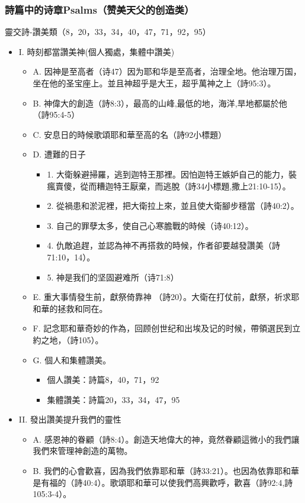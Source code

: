 \subsubsection{詩篇中的诗章Psalms（赞美天父的创造类）}
靈交詩-讚美類（8，20，33，34，40，47，71，92，95）
\begin{itemize}
\item I.	時刻都當讚美神(個人獨處，集體中讚美) 
\begin{itemize}
\item A.	因神是至高者（诗47）因为耶和华是至高者，治理全地。他治理万国，坐在他的圣宝座上。並且神超乎是大王，超乎萬神之上（詩95:3）。
\item B.	神偉大的創造（詩8:3），最高的山峰,最低的地，海洋,旱地都屬於他（詩95:4-5）
\item C.	安息日的時候歌頌耶和華至高的名（詩92小標題）
\item D.	遭難的日子
\begin{itemize}
\item 1.	大衛躲避掃羅，逃到迦特王那裡。因怕迦特王嫉妒自己的能力，裝瘋賣傻，從而糟迦特王厭棄，而逃脫（詩34小標題,撒上21:10-15）。
\item 2.	從禍患和淤泥裡，把大衛拉上來，並且使大衛腳步穩當（詩40:2）。
\item 3.	自己的罪孽太多，使自己心寒膽戰的時候（诗40:12）。
\item 4.	仇敵追趕，並認為神不再搭救的時候，作者卻要越發讚美（詩71:10，14）。
\item 5.	神是我们的坚固避难所（诗71:8）
\end{itemize}
\item E.	重大事情發生前，獻祭倚靠神 （詩20）。大衛在打仗前，獻祭，祈求耶和華的拯救和同在。
\item F.	記念耶和華奇妙的作為，回顾创世纪和出埃及记的时候，帶領選民到立約之地，（詩105）。
\item G.	個人和集體讚美。 
\begin{itemize}
\item 個人讚美：詩篇8，40，71，92
\item 集體讚美：詩篇20，33，34，47，95
\end{itemize}
\end{itemize}
\item II.	發出讚美提升我們的靈性
\begin{itemize}
\item A.	感恩神的眷顧（詩8:4）。創造天地偉大的神，竟然眷顧這微小的我們讓我們來管理神創造的萬物。
\item B.	我們的心會歡喜，因為我們依靠耶和華（詩33:21）。也因為依靠耶和華是有福的（詩40:4）。歌頌耶和華可以使我們高興歡呼，歡喜（詩92:4,詩105:3-4）。

\end{itemize}
\end{itemize}
